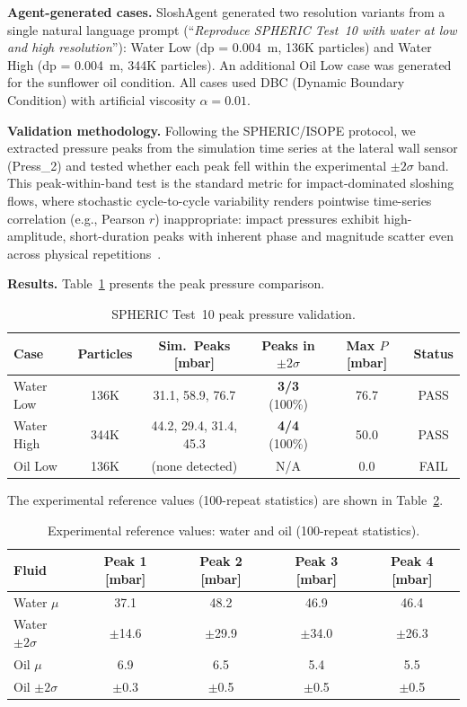 \documentclass[11pt]{article}
\begin{document}
\textbf{Agent-generated cases.} SloshAgent generated two resolution variants from a single natural language prompt (``\textit{Reproduce SPHERIC Test~10 with water at low and high resolution}''): Water Low (dp = 0.004~m, 136K particles) and Water High (dp = 0.004~m, 344K particles). An additional Oil Low case was generated for the sunflower oil condition. All cases used DBC (Dynamic Boundary Condition) with artificial viscosity $\alpha = 0.01$.

\textbf{Validation methodology.} Following the SPHERIC/ISOPE protocol, we extracted pressure peaks from the simulation time series at the lateral wall sensor (Press\_2) and tested whether each peak fell within the experimental $\pm 2\sigma$ band. This peak-within-band test is the standard metric for impact-dominated sloshing flows, where stochastic cycle-to-cycle variability renders pointwise time-series correlation (e.g., Pearson $r$) inappropriate: impact pressures exhibit high-amplitude, short-duration peaks with inherent phase and magnitude scatter even across physical repetitions~\citep{isope2012sloshing, english2021mdbc}.

\textbf{Results.} Table~\ref{tab:spheric} presents the peak pressure comparison.

\begin{table}[htbp]
\centering
\caption{SPHERIC Test~10 peak pressure validation.}
\label{tab:spheric}
\small
\begin{tabular}{@{}lccccc@{}}
\toprule
\textbf{Case} & \textbf{Particles} & \textbf{Sim.\ Peaks [mbar]} & \textbf{Peaks in $\pm 2\sigma$} & \textbf{Max $P$ [mbar]} & \textbf{Status} \\
\midrule
Water Low & 136K & 31.1, 58.9, 76.7 & \textbf{3/3} (100\%) & 76.7 & PASS \\
Water High & 344K & 44.2, 29.4, 31.4, 45.3 & \textbf{4/4} (100\%) & 50.0 & PASS \\
Oil Low & 136K & (none detected) & N/A & 0.0 & FAIL \\
\bottomrule
\end{tabular}
\end{table}

The experimental reference values (100-repeat statistics) are shown in Table~\ref{tab:exp_ref}.

\begin{table}[htbp]
\centering
\caption{Experimental reference values: water and oil (100-repeat statistics).}
\label{tab:exp_ref}
\small
\begin{tabular}{@{}lcccc@{}}
\toprule
\textbf{Fluid} & \textbf{Peak 1 [mbar]} & \textbf{Peak 2 [mbar]} & \textbf{Peak 3 [mbar]} & \textbf{Peak 4 [mbar]} \\
\midrule
Water $\mu$ & 37.1 & 48.2 & 46.9 & 46.4 \\
Water $\pm 2\sigma$ & $\pm$14.6 & $\pm$29.9 & $\pm$34.0 & $\pm$26.3 \\
Oil $\mu$ & 6.9 & 6.5 & 5.4 & 5.5 \\
Oil $\pm 2\sigma$ & $\pm$0.3 & $\pm$0.5 & $\pm$0.5 & $\pm$0.5 \\
\bottomrule
\end{tabular}
\end{table}
\end{document}
